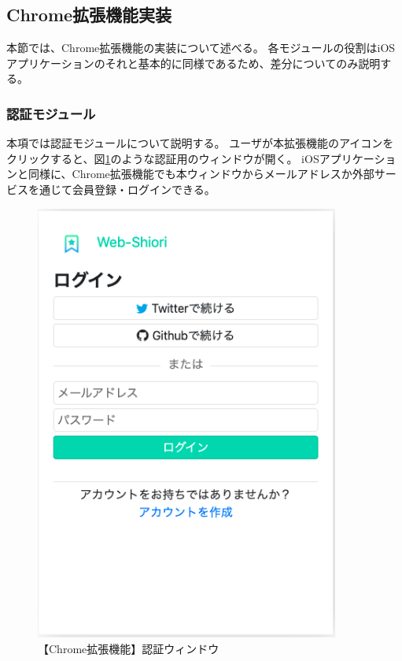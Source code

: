 
\subsection{Chrome拡張機能実装}
本節では、Chrome拡張機能の実装について述べる。
各モジュールの役割はiOSアプリケーションのそれと基本的に同様であるため、差分についてのみ説明する。

\subsubsection{認証モジュール}
本項では認証モジュールについて説明する。
ユーザが本拡張機能のアイコンをクリックすると、図\ref{fig:impl-chrome-auth-view}のような認証用のウィンドウが開く。
iOSアプリケーションと同様に、Chrome拡張機能でも本ウィンドウからメールアドレスか外部サービスを通じて会員登録・ログインできる。

\begin{figure}[htbp]
  \label{fig:impl-chrome-auth-view}
  \begin{center}
    \includegraphics[bb=0 0 404 582,width=10cm]{img/050_implementation/chrome/impl-chrome-auth-view.pdf}
  \end{center}
  \caption{【Chrome拡張機能】認証ウィンドウ}
\end{figure}

